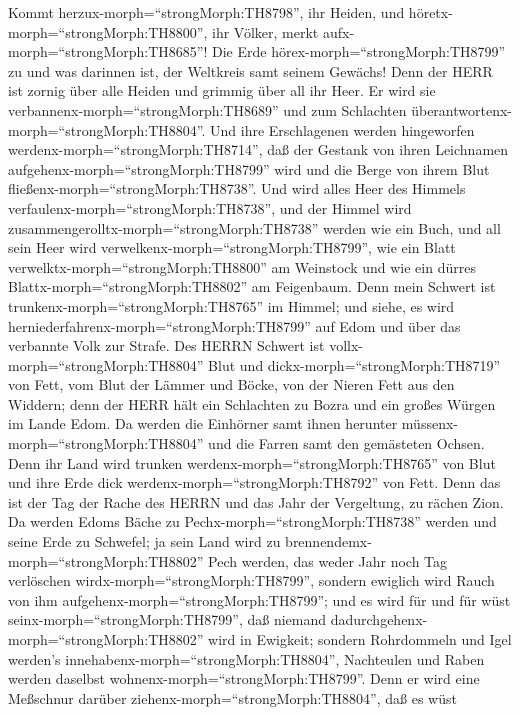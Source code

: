  Kommt herzux-morph=``strongMorph:TH8798'', ihr Heiden, und
höretx-morph=``strongMorph:TH8800'', ihr Völker, merkt
aufx-morph=``strongMorph:TH8685''! Die Erde
hörex-morph=``strongMorph:TH8799'' zu und was darinnen ist, der
Weltkreis samt seinem Gewächs!  Denn der HERR ist zornig
über alle Heiden und grimmig über all ihr Heer. Er wird sie
verbannenx-morph=``strongMorph:TH8689'' und zum Schlachten
überantwortenx-morph=``strongMorph:TH8804''.  Und ihre
Erschlagenen werden hingeworfen werdenx-morph=``strongMorph:TH8714'',
daß der Gestank von ihren Leichnamen
aufgehenx-morph=``strongMorph:TH8799'' wird und die Berge von ihrem Blut
fließenx-morph=``strongMorph:TH8738''.  Und wird alles Heer
des Himmels verfaulenx-morph=``strongMorph:TH8738'', und der Himmel wird
zusammengerolltx-morph=``strongMorph:TH8738'' werden wie ein Buch, und
all sein Heer wird verwelkenx-morph=``strongMorph:TH8799'', wie ein
Blatt verwelktx-morph=``strongMorph:TH8800'' am Weinstock und wie ein
dürres Blattx-morph=``strongMorph:TH8802'' am Feigenbaum. 
Denn mein Schwert ist trunkenx-morph=``strongMorph:TH8765'' im Himmel;
und siehe, es wird herniederfahrenx-morph=``strongMorph:TH8799'' auf
Edom und über das verbannte Volk zur Strafe.  Des HERRN
Schwert ist vollx-morph=``strongMorph:TH8804'' Blut und
dickx-morph=``strongMorph:TH8719'' von Fett, vom Blut der Lämmer und
Böcke, von der Nieren Fett aus den Widdern; denn der HERR hält ein
Schlachten zu Bozra und ein großes Würgen im Lande Edom.  Da
werden die Einhörner samt ihnen herunter
müssenx-morph=``strongMorph:TH8804'' und die Farren samt den gemästeten
Ochsen. Denn ihr Land wird trunken werdenx-morph=``strongMorph:TH8765''
von Blut und ihre Erde dick werdenx-morph=``strongMorph:TH8792'' von
Fett.  Denn das ist der Tag der Rache des HERRN und das Jahr
der Vergeltung, zu rächen Zion.  Da werden Edoms Bäche zu
Pechx-morph=``strongMorph:TH8738'' werden und seine Erde zu Schwefel; ja
sein Land wird zu brennendemx-morph=``strongMorph:TH8802'' Pech werden,
 das weder Jahr noch Tag verlöschen
wirdx-morph=``strongMorph:TH8799'', sondern ewiglich wird Rauch von ihm
aufgehenx-morph=``strongMorph:TH8799''; und es wird für und für wüst
seinx-morph=``strongMorph:TH8799'', daß niemand
dadurchgehenx-morph=``strongMorph:TH8802'' wird in Ewigkeit;
 sondern Rohrdommeln und Igel werden's
innehabenx-morph=``strongMorph:TH8804'', Nachteulen und Raben werden
daselbst wohnenx-morph=``strongMorph:TH8799''. Denn er wird eine
Meßschnur darüber ziehenx-morph=``strongMorph:TH8804'', daß es wüst
